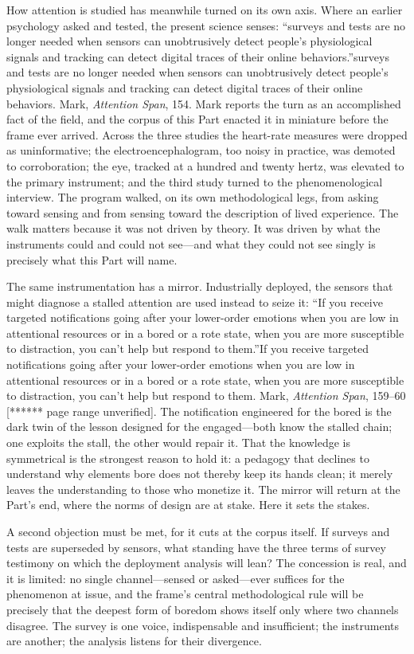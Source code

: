 How attention is studied has meanwhile turned on its own axis. Where an earlier psychology asked and tested, the present science senses: ``surveys and tests are no longer needed when sensors can unobtrusively detect people's physiological signals and tracking can detect digital traces of their online behaviors.''surveys and tests are no longer needed when sensors can unobtrusively detect people's physiological signals and tracking can detect digital traces of their online behaviors. Mark, \textit{Attention Span}, 154. Mark reports the turn as an accomplished fact of the field, and the corpus of this Part enacted it in miniature before the frame ever arrived. Across the three studies the heart-rate measures were dropped as uninformative; the electroencephalogram, too noisy in practice, was demoted to corroboration; the eye, tracked at a hundred and twenty hertz, was elevated to the primary instrument; and the third study turned to the phenomenological interview. The program walked, on its own methodological legs, from asking toward sensing and from sensing toward the description of lived experience. The walk matters because it was not driven by theory. It was driven by what the instruments could and could not see---and what they could not see singly is precisely what this Part will name.

The same instrumentation has a mirror. Industrially deployed, the sensors that might diagnose a stalled attention are used instead to seize it: ``If you receive targeted notifications going after your lower-order emotions when you are low in attentional resources or in a bored or a rote state, when you are more susceptible to distraction, you can't help but respond to them.''If you receive targeted notifications going after your lower-order emotions when you are low in attentional resources or in a bored or a rote state, when you are more susceptible to distraction, you can't help but respond to them. Mark, \textit{Attention Span}, 159--60 [****** page range unverified]. The notification engineered for the bored is the dark twin of the lesson designed for the engaged---both know the stalled chain; one exploits the stall, the other would repair it. That the knowledge is symmetrical is the strongest reason to hold it: a pedagogy that declines to understand why elements bore does not thereby keep its hands clean; it merely leaves the understanding to those who monetize it. The mirror will return at the Part's end, where the norms of design are at stake. Here it sets the stakes.

A second objection must be met, for it cuts at the corpus itself. If surveys and tests are superseded by sensors, what standing have the three terms of survey testimony on which the deployment analysis will lean? The concession is real, and it is limited: no single channel---sensed or asked---ever suffices for the phenomenon at issue, and the frame's central methodological rule will be precisely that the deepest form of boredom shows itself only where two channels disagree. The survey is one voice, indispensable and insufficient; the instruments are another; the analysis listens for their divergence.

